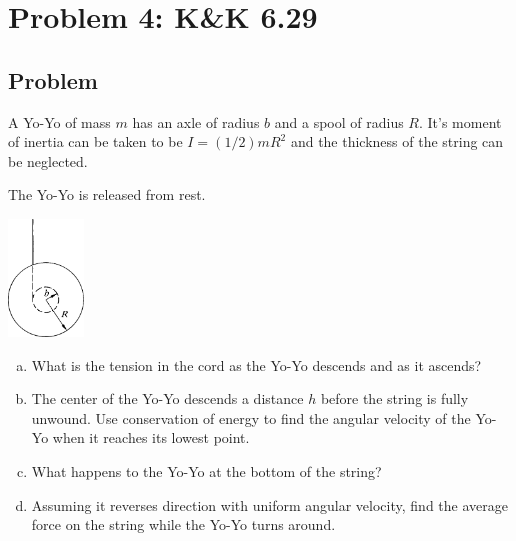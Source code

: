 \documentclass[solutions]{esg8012pset}
\begin{document}
\section*{Problem 4: K\&K 6.29}
\subsection*{Problem}
  A Yo-Yo of mass $m$ has an axle of radius $b$ and a spool of radius $R$. It's moment of inertia can be taken to be $I = (1/2)mR^2$ and the thickness of the string can be neglected.

  The Yo-Yo is released from rest.
  \begin{center}\includegraphics[width=0.15\textwidth]{ps09_4}\end{center}
  \begin{enumerate}[(a)]
    \item What is the tension in the cord as the Yo-Yo descends and as it ascends?
    \item The center of the Yo-Yo descends a distance $h$ before the string is fully unwound. Use conservation of energy to find the angular velocity of the Yo-Yo when it reaches its lowest point.
    \item What happens to the Yo-Yo at the bottom of the string?
    \item Assuming it reverses direction with uniform angular velocity, find the average force on the string while the Yo-Yo turns around.
  \end{enumerate}
\end{document}
